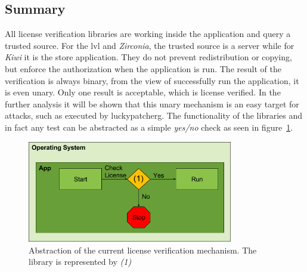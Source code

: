 \subsection{Summary} \label{section:license-abstraction}
All license verification libraries are working inside the application and query a trusted source.
For the \gls{lvl} and \textit{Zirconia}, the trusted source is a server while for \textit{Kiwi} it is the store application.
They do not prevent redistribution or copying, but enforce the authorization when the application is run.
The result of the verification is always binary, from the view of successfully run the application, it is even unary.
Only one result is acceptable, which is license verified.
In the further analysis it will be shown that this unary mechanism is an easy target for attacks, such as executed by \gls{luckypatcherg}.
\newline
The functionality of the libraries and in fact any test can be abstracted as a simple \textit{yes/no} check as seen in figure~\ref{fig:verificationNow}.
\begin{figure}[h]
    \centering
    \includegraphics[width=0.8\textwidth]{data/verificationNow.png}
    \caption{Abstraction of the current license verification mechanism. The library is represented by \textit{(1)}}
    \label{fig:verificationNow}
\end{figure}
